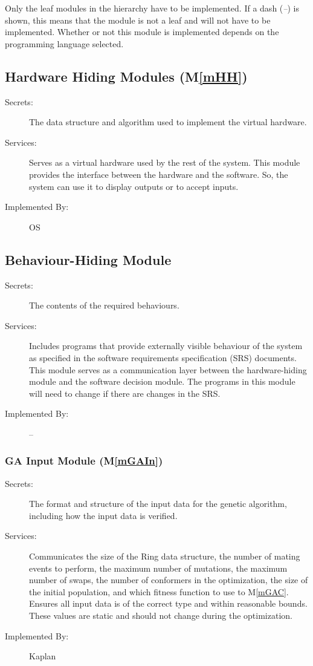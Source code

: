 \documentclass[12pt, titlepage]{article}
\newcommand{\mref}[1]{M\ref{#1}}
\newcommand{\progname}{Kaplan} %
\begin{document}
Only the leaf modules in the
hierarchy have to be implemented. If a dash (\emph{--}) is shown, this means
that the module is not a leaf and will not have to be implemented. Whether or
not this module is implemented depends on the programming language
selected.

\subsection{Hardware Hiding Modules (\mref{mHH})}

\begin{description}
\item[Secrets:]The data structure and algorithm used to implement the virtual
  hardware.
\item[Services:]Serves as a virtual hardware used by the rest of the
  system. This module provides the interface between the hardware and the
  software. So, the system can use it to display outputs or to accept inputs.
\item[Implemented By:] OS
\end{description}

\subsection{Behaviour-Hiding Module}

\begin{description}
\item[Secrets:]The contents of the required behaviours.
\item[Services:]Includes programs that provide externally visible behaviour of
  the system as specified in the software requirements specification (SRS)
  documents. This module serves as a communication layer between the
  hardware-hiding module and the software decision module. The programs in this
  module will need to change if there are changes in the SRS.
\item[Implemented By:] --
\end{description}

\subsubsection{GA Input Module (\mref{mGAIn})}

\begin{description}
\item[Secrets:]The format and structure of the input data for the genetic 
algorithm, including how the input data is verified.
\item[Services:] Communicates the size of the Ring data structure, the number 
of mating events to perform, the maximum number of mutations, the maximum 
number of swaps, the number of conformers in the optimization, the size of the 
initial population, and which fitness function to use to \mref{mGAC}. Ensures 
all input data is of the correct type and within reasonable 
bounds. These values are static and should not change during the optimization.
\item[Implemented By:] \progname{}
\end{description}
\end{document}
